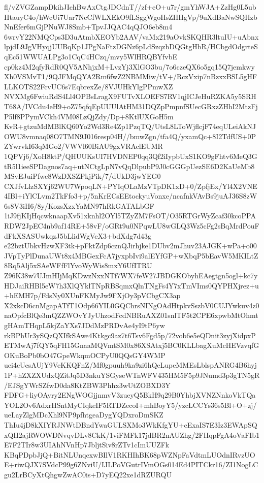 \documentclass[multi=frame]{standalone}
\begin{document}
\begin{world}
        fl/vZVGZampDkihJIchBwAxCtgJDCdnT//zf+eO+u7r/gmYhWJA+ZzHg0L5ubHtauyC4o/hWcUi7Uar7NcCfWLXEkO9fLSggWgoHsZHHgVp/9uXdBaNwSQHzbNnEfer6mGjPNuWJ8Smb+TpvJJQAC4qQJO6eb8m4
        6wrvY22NMQCps3D3uAtmbXEOYb2AAV/vaMx219aOvkSKQHR3ltuIU+uAbnxlpjdL9JgVHyqjUUBqKp1JPgNaFtzDGNz6pLdSzqzbDQGtgHbR/HCbgdOdgrteSqEc51WWUALPg3o1CqC4HCzq/mvy5WlHRQBYfvbE
        cp0kz4M2qfyRdR0QV5ANhjxM+LvzYj3XlGO3bu/7o6czeQX6o5gq15Q7jemkwyXh0VSMvT1/9QJFMqQYA2Rm6fwZ2NBMMiw/tV+/RczVxip7nBzxxBSL5gHFLLKOTS22FcvUC6s7EqbrexZe/8VJUHkYlgPPmwXZ
        NVXMg6FwiuRdS4Ll4OPBsLragX9FUTvXLOEFS7RV1qjICJeHuRZKA5y5SRHT68A/IVCdu4eH9+oZ75qfqEpUUUlAtHM31DQZpPmpnfSUecGRxzZHhI2MtzFjP5lf8PPymVCkh4VM08LzQjZdy/Dp+8KtlUXGoH5m
        KvR+gtzuMdMBlKQ60Yo2Wd3Re4Zp1PzqTQ/UtsL8LToWjflcjF74eqULeiAkNJOWU8vmnaq08O7TMN9J016resp04H//bmwZgn/tfa4Q/yxamQc+8I2TdfUS+0PZYwrvkI63qMGo2/VWVl60BiAU9gxVRAclEUMR
        1QPVj6/XoH8ktP/QHUUKsUI7HVDNEP0qq3Qf2iIypbUxS1KO9gFhtv6MeQ3GtR5l1ieeSPDagnos7aq+utNCtgLpN7vQqDlpubP9J0cGGGpUezSE6D2KaUeMb8MSvEJuiPfwc8WzDXSZPkjPik/7/dUkD3jwYEG0
        CXJfvLlzSXYj62WU7WpoqLN+PYIqOLaMzVTpDK1xD+0/ZpfjEx/Yl4X2VNE4IBl+iYlCLvm2TkFfo3+p/5nKrECsEEtockyuVonxe/ncafnkVAvBs9juAJ36S8zW6s8V3iH6/8y/KozsXzxYaMN97hRkGATALbGF
        1iJ9fjKIjHqcwknaapXv51xknhl2OYl5TZyZM7FsOT/O35RTGrWyZcaf30kcoPPARDW2JpEC4nb9af14RE+58vF/oGRt9u0NPqwLU8wGLQ3Wz5cFg2sBqMrdPouFdFkXSASUwkqzJ5bLlidWgVeX3+bdXdg7d43g
        e22bztUbkvHzwXF3tk+pFktZdp6cznQJirhjke1DUbv2mJhuv23AJGK+wPa+o00JVpTyPlDunaUWt8x4MBGexFcA7jyxpbIvi9alEYfGP+wXbqP5bEavW5MKILtZ8Rq5Alj5xSAeWFfFlYvoWyWis8mxY6UfITRU
        Z96K38w7UJmHIjMqKDwzNxxNTf7WX7feW27JBDGKObyhEAegtgn5ogl+kc7yHDJaiRHBl5eW7h3XlQYklTNpRBSqmxQlnTNgFs4Y7xTmVIms0QYPHXjrez+u+hEMH7p/FdsNy0XUnFKMyJw9FXjOy3pVCbgCX3ap
        X2xkcD6cnMgapATfT1Odp66YIL0GQChrsNINgOAdHtpkvSszbV0CUJYwkuv4z0naOpfcBlQe3mQZZWOvYJyUhzodFcdNBRuAXZ01snlTF5t2CPE6xpwbMtOhmtgHAmTHqpL5kjZaYXs7JDdMzPRDvAe4yI9tP6yw
        rkBPhUr3ySQzQXIfkSAwe4Ktkgc9az7t6Tsv6Fgd5p/72vob6e5eQDnit3zyjXidpxPETMwAj7fQY5qFH15GnaaMQVmtSM0x86XSAtxj5BC0KLLbagXuMcHEVzvqfGOKuBoPb0bO47GpeWkqmOCPyU0QQsGY4WMP
        uei4cUcsAUjY9VeKKQFnZ/Mf0gpuuh9ka9zi6hQeLupeMMEsLblspANRG4B6hyj1P+hZXZXUdxQZitJq5D3nkuYSGyseWTnWFV435HM5F5p9JNumd3p3gTN5gR/EJSgYWrSZfwD0da8KtZBW3Phhx3wUtZOBXD3Y
        FDFG+liyOAyry2ENgWOGjjnmvV3zueyQ5BkH9q29B0YhbjXVNZNnkoVkTQaYOL2Ov6AdxrHSntMyCIqkeIF5RTDZecoI+mhBoyY5/yzcLCCYs36s5Bl+O+zj/ueLayZlgMDcXhl9NP9pfhtgeaDygYQDxroDmSKZ
        ThIu4jD8kXIYRJNWtDBndYwaGULSXMo3WkKfgYU+cExaIS7E3Iz3EWApSQxQH2ajRWOWDNvqvDLv8CkK/1viFMFk17jdBR2nAUZhg/2FHqpFgA4oVaFIb1E7F2TIr8w3UIAhNVnHp7JbljtSiv8rZTv1cImUUZFk
        KBqPDpbJjQ+BitNLUnqcxwBIlV1RKHIhBK68pWZNpFaVdtmLUOdnIRvzUOE+riwQJX7SVdcP99g6ZNviU/IJLPoVGutrIVmOGs014Ed4PITCkr16/ZI1NogLCgu2LrBCyXtQhgwZwAC0is+D7yEQ22xe1dRZURQU

\end{world}
\end{document}
